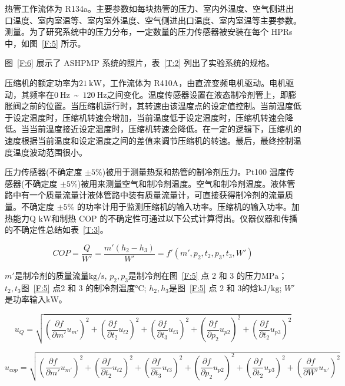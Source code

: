 热管工作流体为 R134a。主要参数如每块热管的压力、室内外温度、空气侧进出口温度、室内室温等、室内室外温度、空气侧进出口温度、室内室温等主要参数。测量。为了研究系统中的压力分布，一定数量的压力传感器被安装在每个 HPRs 中，如图~\ref{F:5} 所示。

图~\ref{F:6} 展示了 ASHPMP 系统的照片，表~\ref{T:2} 列出了实验系统的规格。

压缩机的额定功率为$\qty{21}{\kW} $，工作流体为 R410A，由直流变频电机驱动。电机驱动，其频率在$\qty{0}{\hertz}$~\textasciitilde~$\qty{120}{\hertz} $之间变化。温度传感器设置在液态制冷剂管上，即膨胀阀之前的位置。当压缩机运行时，其转速由该温度点的设定值控制。当前温度低于设定温度时，压缩机转速会增加，当前温度低于设定温度时，压缩机转速会降低。当当前温度接近设定温度时，压缩机转速会降低。在一定的逻辑下，压缩机的速度根据当前温度和设定温度之间的差值来调节压缩机的转速。最后，最终控制温度温度波动范围很小。

压力传感器(不确定度 $\pm 5\%$)被用于测量热泵和热管的制冷剂压力。Pt100 温度传感器(不确定度 $\pm 5\%$)被用来测量空气和制冷剂温度。空气和制冷剂温度。液体管路中有一个质量流量计液体管路中装有质量流量计，可直接获得制冷剂的流量质量。不确定度 $\pm 5\%$ 的功率计用于监测压缩机的输入功率。压缩机的输入功率。加热能力Q $\unit{\kW} $和制热 COP 的不确定性可通过以下公式计算得出。仪器仪器和传播的不确定性总结如表~\ref{T:3}。

\begin{equation}\label{E:3}
	COP = \frac{Q}{W'} = \frac{m'(h_2 - h_3)}{W'} = f'(m',p_2,t_2,p_3,t_3,W')
\end{equation}

$m'$是制冷剂的质量流量$\unit{\kg/\s} $, $p_2, p_3$是制冷剂在图~\ref{F:5} 点 2 和 3 的压力$\unit{\MPa} $；$t_2, t_3$图~\ref{F:5} 点2 和 3 的制冷剂温度$\unit{\degreeCelsius} $; $h_2, h_3$是图~\ref{F:5} 点 2 和 3的焓$\unit{\kJ/\kg} $; $W'$是功率输入$\unit{\kW} $。

\begin{equation}\label{E:4}
	u_Q = \sqrt{(\frac{\partial f}{\partial m'} u_{m'})^2 + (\frac{\partial f}{\partial t_2} u_{t2})^2 + (\frac{\partial f}{\partial t_3} u_{t3} )^2+ (\frac{\partial f}{\partial p_2} u_{p2})^2 + (\frac{\partial f}{\partial t_2} u_{p3} )^2}
\end{equation}

\begin{equation}\label{E:5}
	u_{cop} = \sqrt{(\frac{\partial f}{\partial m'} u_{m'})^2 + (\frac{\partial f}{\partial t_2} u_{t2})^2 + (\frac{\partial f}{\partial t_3} u_{t3} )^2+ (\frac{\partial f}{\partial p_2} u_{p2})^2 + (\frac{\partial f}{\partial t_2} u_{p3} )^2 + (\frac{\partial f}{\partial W'} u_{w'})^2}
\end{equation}

